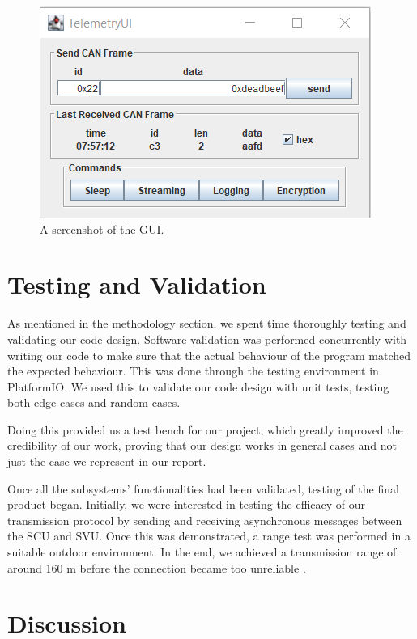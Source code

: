\documentclass[a4paper,conference]{IEEEtran}
\begin{document}
\begin{figure}
    \centering
    \includegraphics[width=\linewidth]{documentation/images/swing.png}
    \caption{A screenshot of the GUI.}
    \label{fig:gui_screenshot}
\end{figure}


\section{Testing and Validation} %
As mentioned in the methodology section, we spent time thoroughly testing and validating our code design. Software validation was performed concurrently with writing our code to make sure that the actual behaviour of the program matched the expected behaviour. This was done through the testing environment in PlatformIO. We used this to validate our code design with unit tests, testing both edge cases and random cases.

Doing this provided us a test bench for our project, which greatly improved the credibility of our work, proving that our design works in general cases and not just the case we represent in our report.

Once all the subsystems' functionalities had been validated, testing of the final product began. Initially, we were interested in testing the efficacy of our transmission protocol by sending and receiving asynchronous messages between the SCU and SVU. Once this was demonstrated, a range test was performed in a suitable outdoor environment. In the end, we achieved a transmission range of around 160 m before the connection became too unreliable \cite{rangeTest}. 

\section{Discussion}
\end{document}

